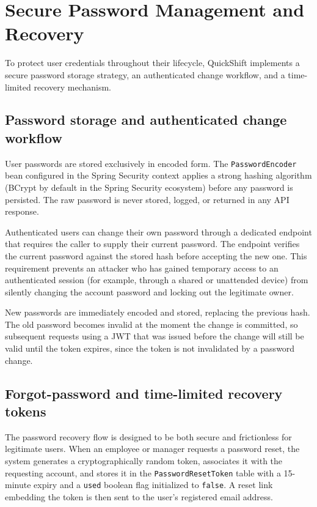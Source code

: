 \section{Secure Password Management and Recovery}
\par To protect user credentials throughout their lifecycle, QuickShift implements a secure password storage strategy, an authenticated change workflow, and a time-limited recovery mechanism.

\subsection{Password storage and authenticated change workflow}
\par User passwords are stored exclusively in encoded form. The \texttt{PasswordEncoder} bean configured in the Spring Security context applies a strong hashing algorithm (BCrypt\cite{bcrypt1999} by default in the Spring Security ecosystem) before any password is persisted. The raw password is never stored, logged, or returned in any API response.

\par Authenticated users can change their own password through a dedicated endpoint that requires the caller to supply their current password. The endpoint verifies the current password against the stored hash before accepting the new one. This requirement prevents an attacker who has gained temporary access to an authenticated session (for example, through a shared or unattended device) from silently changing the account password and locking out the legitimate owner.

\par New passwords are immediately encoded and stored, replacing the previous hash. The old password becomes invalid at the moment the change is committed, so subsequent requests using a JWT that was issued before the change will still be valid until the token expires, since the token is not invalidated by a password change. 

\subsection{Forgot-password and time-limited recovery tokens}
\par The password recovery flow is designed to be both secure and frictionless for legitimate users. When an employee or manager requests a password reset, the system generates a cryptographically random token, associates it with the requesting account, and stores it in the \texttt{PasswordResetToken} table with a 15-minute expiry and a \texttt{used} boolean flag initialized to \texttt{false}. A reset link embedding the token is then sent to the user's registered email address.

